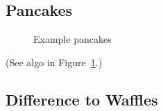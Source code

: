 \documentclass{article}
\begin{document}
\subsection{Pancakes}

\begin{figure}
    \centering
    \caption{Example pancakes}
    \label{fig-pancake}
\end{figure}

\lipsum[3]
(See algo in Figure~\ref{fig-pancake}.)


\subsection{Difference to Waffles}
\lipsum[2]




\end{document}
